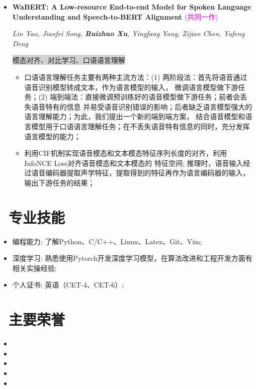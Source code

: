 \documentclass{resume}
\begin{document}
\begin{itemize}[parsep=0.5ex]
  \item \textbf{WaBERT: A Low-resource End-to-end Model for Spoken Language Understanding and Speech-to-BERT Alignment}
        \textcolor{magenta}{(共同一作)}
        \href{https://arxiv.org/abs/2204.10461}{\textcolor{linkcolor}{\faExternalLink{}}}

        \textit{Lin Yao, Jianfei Song, \textbf{Ruizhuo Xu}, Yingfang Yang, Zijian Chen, Yafeng Deng}

        \colorbox{lightgray}{模态对齐、对比学习、口语语言理解}

        \begin{itemize}[parsep=0.5ex]
          \item 口语语言理解任务主要有两种主流方法：(1) 两阶段法：首先将语音通过语音识别模型转成文本，作为语言模型的输入，
                微调语言模型做下游任务；(2) 端到端法：直接微调预训练好的语音模型做下游任务；前者会丢失语音特有的信息
                并易受语音识别错误的影响；后者缺乏语言模型强大的语言理解能力；为此，我们提出一个新的端到端方案，
                结合语音模型和语言模型用于口语语言理解任务；在不丢失语音特有信息的同时，充分发挥语言模型的能力；
          \item 利用CIF机制实现语音模态和文本模态特征序列长度的对齐，利用InfoNCE Loss对齐语音模态和文本模态的
                特征空间; 推理时，语音输入经过语音编码器提取声学特征，提取得到的特征再作为语言编码器的输入，
                输出下游任务的结果；
        \end{itemize}
        
\end{itemize}

\section{\faCogs\ 专业技能}
\begin{itemize}[parsep=0.5ex]
  \item 编程能力: 了解Python、C/C++、Linux、Latex、Git、Vim;
  \item 深度学习: 熟悉使用Pytorch开发深度学习模型，在算法改进和工程开发方面有相关实操经验;
  \item 个人证书: 英语（CET-4、CET-6）;
\end{itemize}

\section{\faHeartO\ 主要荣誉}
\begin{itemize}[parsep=0.5ex]
  \item {}
  \item {}
  \item {}
  \item {}
  \item {}
\end{itemize}


%
%
\end{document}
